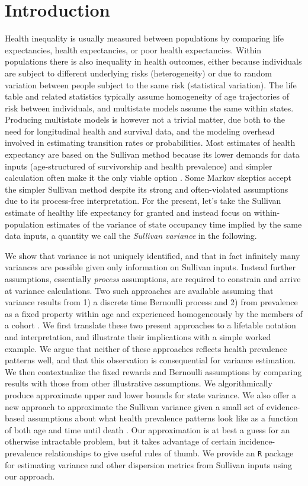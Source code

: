 \documentclass{bmcart}
\begin{document}
\section{Introduction}
Health inequality is usually measured between populations by comparing life expectancies, health expectancies, or poor health expectancies. Within populations there is also inequality in health outcomes, either because individuals are subject to different underlying risks (heterogeneity) or due to random variation between people subject to the same risk (statistical variation). The life table and related statistics typically assume homogeneity of age trajectories of risk between individuals, and multistate models assume the same within states. Producing multistate models is however not a trivial matter, due both to the need for longitudinal health and survival data, and the modeling overhead involved in estimating transition rates or probabilities. Most estimates of health expectancy are based on the Sullivan method \citep{sullivan1971single} because its lower demands for data inputs (age-structured of survivorship and health prevalence) and simpler calculation often make it the only viable option \citep{Cambois2001Viable}. Some Markov skeptics accept the simpler Sullivan method despite its strong and often-violated assumptions \citep{mathers1997good, imai2007estimation} due to its process-free interpretation. For the present, let's take the Sullivan estimate of healthy life expectancy for granted and instead focus on within-population estimates of the variance of state occupancy time implied by the same data inputs, a quantity we call the \emph{Sullivan variance} in the following. 

We show that variance is not uniquely identified, and that in fact infinitely many variances are possible given only information on Sullivan inputs. Instead further assumptions, essentially \emph{process} assumptions, are required to constrain and arrive at variance calculations. Two such approaches are available assuming that variance results from 1) a discrete time Bernoulli process and 2) from prevalence as a fixed property within age and experienced homogeneously by the members of a cohort \citep{caswell2018matrix}. We first translate these two present approaches to a lifetable notation and interpretation, and illustrate their implications with a simple worked example. We argue that neither of these approaches reflects health prevalence patterns well, and that this observation is consequential for variance estimation. We then contextualize the fixed rewards and Bernoulli assumptions by comparing results with those from other illustrative assumptions. We algorithmically produce approximate upper and lower bounds for state variance. We also offer a new approach to approximate the Sullivan variance given a small set of evidence-based assumptions about what health prevalence patterns look like as a function of both age and time until death \citep{klijs2010disability, riffe2016time, riffe2017hle}. Our approximation is at best a guess for an otherwise intractable problem, but it takes advantage of certain incidence-prevalence relationships to give useful rules of thumb. We provide an \texttt{R} package for estimating variance and other dispersion metrics from Sullivan inputs using our approach.
\end{document}
